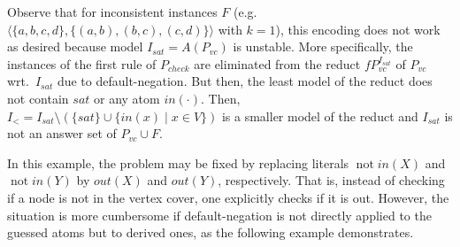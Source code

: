 \documentclass[11pt,fleqn,twoside]{article}
\def\naf{\ensuremath{\mathop{not}}}
\begin{document}
			Observe that
			for inconsistent instances $F$ (e.g.~$\langle \{a,b,c,d\}, \{(a,b),(b,c),(c,d)\} \rangle$ with $k=1$), this encoding does not work as desired
			because model $I_{\mathit{sat}} = A(P_{\mathit{vc}})$ is unstable.
			More specifically, the instances of the first rule of $P_{\mathit{check}}$ are eliminated from the reduct $f P_{\mathit{vc}}^{I_\mathit{sat}}$ of $P_{\mathit{vc}}$ wrt.~$I_\mathit{sat}$ due to default-negation.
			But then, the least model of the reduct does not contain $\mathit{sat}$ or any atom $\mathit{in}(\cdot)$.
			Then, $I_{\mathit{<}} = I_{\mathit{sat}} \setminus ( \{ \mathit{sat} \} \cup \{ \mathit{in}(x) \mid x \in V \} )$ is a smaller model of the reduct
			and $I_{\mathit{sat}}$ is not an answer set of $P_{\mathit{vc}} \cup F$.
			
			In this example, the problem may be fixed by replacing literals $\naf \mathit{in}(X)$ and $\naf \mathit{in}(Y)$ by $\mathit{out}(X)$ and $\mathit{out}(Y)$, respectively.
			That is, instead of checking if a node is not in the vertex cover, one explicitly checks if it is out.
			However, the situation is more cumbersome if default-negation is not directly applied to the guessed atoms but to derived ones,
			as the following example demonstrates.
			
			
			
\end{document}
